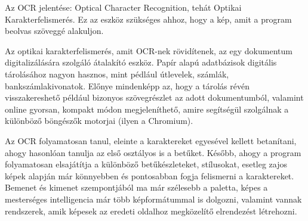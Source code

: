 
Az OCR jelentése: Optical Character Recognition, tehát Optikai Karakterfelismerés. Ez az eszköz szükséges ahhoz, hogy a kép, amit a program beolvas szöveggé alakuljon.

Az optikai karakterfelismerés, amit OCR-nek rövidítenek, az egy dokumentum digitalizálására szolgáló átalakító eszköz. Papír alapú adatbázisok digitális tárolásához nagyon hasznos, mint pédlául útlevelek, számlák, bankszámlakivonatok. Előnye mindenképp az, hogy a tárolás révén visszakereshető például bizonyos szövegrészlet az adott dokumentumból, valamint online gyorsan, kompakt módon megjeleníthető, amire segítségül szolgálnak a különböző böngészők motorjai (ilyen a Chromium). 

Az OCR folyamatosan tanul, eleinte a karaktereket egyesével kellett betanítani, ahogy hasonlóan tanulja az első osztályos is a betűket. Később, ahogy a program folyamatosan elsajátítja a különböző betűkészleteket, stílusokat, esetleg zajos képek alapján már könnyebben és pontosabban fogja felismerni a karaktereket. Bemenet és kimenet szempontjából ma már szélesebb a paletta, képes a mesterséges intelligencia már több képformátummal is dolgozni, valamint vannak rendszerek, amik képesek az eredeti oldalhoz megközelítő elrendezést létrehozni.


